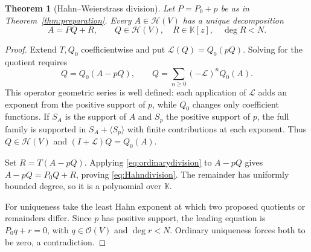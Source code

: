 \documentclass[11pt,a4paper]{article}
\newtheorem{theorem}{Theorem}[section]
\theoremstyle{definition}\newtheorem{definition}[theorem]{Definition}
\theoremstyle{remark}\newtheorem{remark}[theorem]{Remark}
\newcommand{\K}{\mathbb K}
\newcommand{\A}{\mathscr H}\newcommand{\hol}{\mathcal O}
\numberwithin{equation}{section}
\begin{document}
\begin{theorem}[Hahn--Weierstrass division]\label{thm:division}
Let $P=P_0+p$ be as in Theorem~\ref{thm:preparation}. Every $A\in\A(V)$ has a unique decomposition
\begin{equation}\label{eq:Hahndivision}
 A=PQ+R,
 \qquad Q\in\A(V),\quad R\in\K[z],\quad\deg R<N.
\end{equation}
\end{theorem}
\begin{proof}
Extend $T,Q_0$ coefficientwise and put $\mathcal L(Q)=Q_0(pQ)$. Solving for the quotient requires
\[
 Q=Q_0(A-pQ),\qquad
 Q=\sum_{n\geq0}(-\mathcal L)^nQ_0(A).
\]
This operator geometric series is well defined: each application of $\mathcal L$ adds an exponent from the positive support of $p$, while $Q_0$ changes only coefficient functions. If $S_A$ is the support of $A$ and $S_p$ the positive support of $p$, the full family is supported in $S_A+\langle S_p\rangle$ with finite contributions at each exponent. Thus $Q\in\A(V)$ and $(I+\mathcal L)Q=Q_0(A)$.

Set $R=T(A-pQ)$. Applying \eqref{eq:ordinarydivision} to $A-pQ$ gives $A-pQ=P_0Q+R$, proving \eqref{eq:Hahndivision}. The remainder has uniformly bounded degree, so it is a polynomial over $\K$.

For uniqueness take the least Hahn exponent at which two proposed quotients or remainders differ. Since $p$ has positive support, the leading equation is $P_0q+r=0$, with $q\in\hol(V)$ and $\deg r<N$. Ordinary uniqueness forces both to be zero, a contradiction.
\end{proof}
\end{document}

